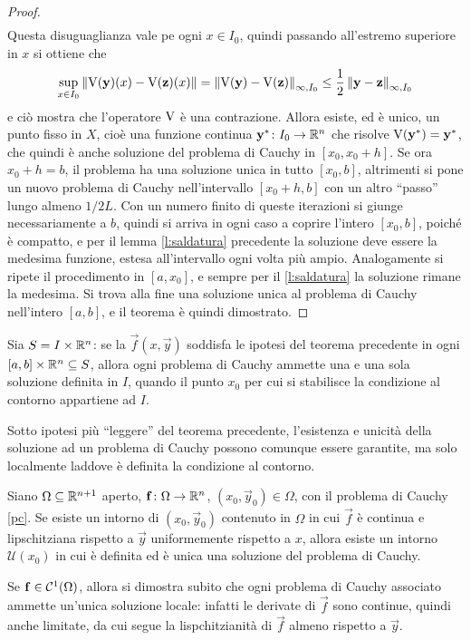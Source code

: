 \begin{proof}
\begin{align*}
\end{align*}
Questa disuguaglianza vale pe ogni $x\in I_0$, quindi passando all'estremo superiore in $x$ si ottiene che
\[
\sup_{x\in I_0}\left\|{\operatorname{V}(\mathbf{y})(x)-\operatorname{V}(\mathbf{z})(x)}\right\|=\left\|{\operatorname{V}(\mathbf{y})-\operatorname{V}(\mathbf{z})}\right\|_{\infty,I_0}\leq\frac12\left\|{\mathbf{y}-\mathbf{z}}\right\|_{\infty,I_0}
\]
e ciò mostra che l'operatore $\operatorname{V}$ è una contrazione. Allora esiste, ed è unico, un punto fisso in $X$, cioè una funzione continua $\mathbf{y}^*\colon I_0\to\mathbb{R}^n$ che risolve $\operatorname{V}(\mathbf{y}^*)=\mathbf{y}^*$, che quindi è anche soluzione del problema di Cauchy in $[x_0,x_0+h]$.
Se ora $x_0+h=b$, il problema ha una soluzione unica in tutto $[x_0,b]$, altrimenti si pone un nuovo problema di Cauchy nell'intervallo $[x_0+h,b]$ con un altro ``passo'' lungo almeno $1/2L$. Con un numero finito di queste iterazioni si giunge necessariamente a $b$, quindi si arriva in ogni caso a coprire l'intero $[x_0,b]$, poiché è compatto, e per il lemma \ref{l:saldatura} precedente la soluzione deve essere la medesima funzione, estesa all'intervallo ogni volta più ampio. Analogamente si ripete il procedimento in $[a,x_0]$, e sempre per il \ref{l:saldatura} la soluzione rimane la medesima. Si trova alla fine una soluzione unica al problema di Cauchy nell'intero $[a,b]$, e il teorema è quindi dimostrato.
\end{proof}

\begin{corollario}
Sia $S=I\times\mathbb{R}^n$: se la $\vec f(x,\vec y)$ soddisfa le ipotesi del teorema precedente in ogni $[a,b]\times\mathbb{R}^n\subseteq S$, allora ogni problema di Cauchy ammette una e una sola soluzione definita in $I$, quando il punto $x_0$ per cui si stabilisce la condizione al contorno appartiene ad $I$.
\end{corollario}

Sotto ipotesi più ``leggere'' del teorema precedente, l'esistenza e unicità della soluzione ad un problema di Cauchy possono comunque essere garantite, ma solo localmente laddove è definita la condizione al contorno.
\begin{teorema} \label{t:E-locale}
Siano $\Omega\subseteq\mathbb{R}^{n+1}$ aperto, $\mathbf{f}\colon\Omega\to\mathbb{R}^n$, $(x_0,\vec y_0)\in\Omega$, con il problema di Cauchy \eqref{pc}. Se esiste un intorno di $(x_0,\vec y_0)$ contenuto in $\Omega$ in cui $\vec f$ è continua e lipschitziana rispetto a $\vec y$ uniformemente rispetto a $x$, allora esiste un intorno $\mathcal U(x_0)$ in cui è definita ed è unica una soluzione del problema di Cauchy.
\end{teorema}
Se $\mathbf{f}\in\mathcal{C}^{{1}}(\Omega)$, allora si dimostra subito che ogni problema di Cauchy associato ammette un'unica soluzione locale: infatti le derivate di $\vec f$ sono continue, quindi anche limitate, da cui segue la lispchitzianità di $\vec f$ almeno rispetto a $\vec y$.

